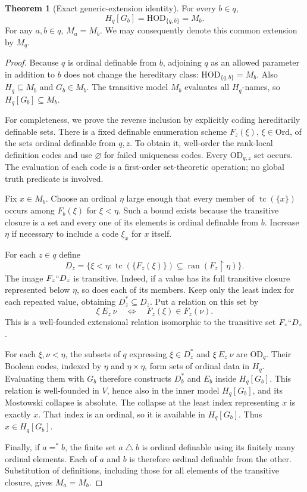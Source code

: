 \documentclass[11pt,letterpaper]{article}
\theoremstyle{definition}
\newtheorem{theorem}[definition]{Theorem}
\numberwithin{equation}{section}
\newcommand{\HOD}{\mathrm{HOD}}
\newcommand{\OD}{\mathrm{OD}}
\newcommand{\ran}{\operatorname{ran}}
\newcommand{\Ord}{\mathrm{Ord}}
\newcommand{\restr}{\mathbin{\upharpoonright}}
\newcommand{\tc}{\operatorname{tc}}
\newcommand{\symdiff}{\mathbin{\triangle}}
\begin{document}
\begin{theorem}[Exact generic-extension identity]\label{thm:vopenka}
For every $b\in q$,
\[
 H_q[G_b]=\HOD_{\{q,b\}}=M_b.
\]
For any $a,b\in q$, $M_a=M_b$. We may consequently denote this common
extension by $M_q$.
\end{theorem}
\begin{proof}
Because $q$ is ordinal definable from $b$, adjoining $q$ as an allowed
parameter in addition to $b$ does not change the hereditary class:
$\HOD_{\{q,b\}}=M_b$. Also $H_q\subseteq M_b$ and $G_b\in M_b$.
The transitive model $M_b$ evaluates all $H_q$-names, so
$H_q[G_b]\subseteq M_b$.

For completeness, we prove the reverse inclusion by explicitly coding
hereditarily definable sets. There is a fixed definable enumeration
scheme $F_z(\xi)$, $\xi\in\Ord$, of the sets ordinal definable from
$q,z$. To obtain it, well-order the rank-local definition codes and use
$\varnothing$ for failed uniqueness codes. Every $\OD_{q,z}$ set occurs.
The evaluation of each code is a first-order set-theoretic operation;
no global truth predicate is involved.

Fix $x\in M_b$. Choose an ordinal $\eta$ large enough that every member
of $\tc(\{x\})$ occurs among $F_b(\xi)$ for $\xi<\eta$. Such a bound
exists because the transitive closure is a set and every one of its
elements is ordinal definable from $b$. Increase $\eta$ if necessary to
include a code $\xi_x$ for $x$ itself.

For each $z\in q$ define
\[
 D_z=\{\xi<\eta:\tc(\{F_z(\xi)\})
                  \subseteq\ran(F_z\restr\eta)\}.
\]
The image $F_z``D_z$ is transitive. Indeed, if a value has its full
transitive closure represented below $\eta$, so does each of its
members. Keep only the least index for each repeated value, obtaining
$D_z^*\subseteq D_z$. Put a relation on this set by
\[
 \xi\ E_z\ \nu\quad\Longleftrightarrow\quad F_z(\xi)\in F_z(\nu).
\]
This is a well-founded extensional relation isomorphic to the transitive
set $F_z``D_z$.

For each $\xi,\nu<\eta$, the subsets of $q$ expressing
$\xi\in D_z^*$ and $\xi\ E_z\ \nu$ are $\OD_q$.
Their Boolean codes, indexed by $\eta$ and $\eta\times\eta$, form sets
of ordinal data in $H_q$. Evaluating them with $G_b$ therefore constructs
$D_b^*$ and $E_b$ inside $H_q[G_b]$. This relation is well-founded in
$V$, hence also in the inner model $H_q[G_b]$, and its Mostowski collapse
is absolute. The collapse at the least index representing $x$ is exactly
$x$. That index is an ordinal, so it is available in $H_q[G_b]$.
Thus $x\in H_q[G_b]$.

Finally, if $a=^*b$, the finite set $a\symdiff b$ is ordinal definable
using its finitely many ordinal elements. Each of $a$ and $b$ is
therefore ordinal definable from the other. Substitution of definitions,
including those for all elements of the transitive closure, gives
$M_a=M_b$.
\end{proof}
\end{document}
